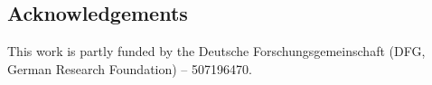 \documentclass[agile, final]{copernicus-agile}
\begin{document}
\subsection*{Acknowledgements}
This work is partly funded by the Deutsche Forschungsgemeinschaft (DFG, German Research Foundation) -- 507196470.




\end{document}
